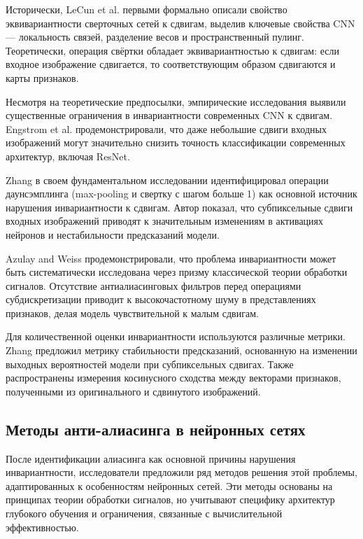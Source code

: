 Исторически, LeCun et al. \cite{lecun1998gradient} первыми формально описали свойство эквивариантности сверточных сетей к сдвигам, выделив ключевые свойства CNN — локальность связей, разделение весов и пространственный пулинг. Теоретически, операция свёртки обладает эквивариантностью к сдвигам: если входное изображение сдвигается, то соответствующим образом сдвигаются и карты признаков.

Несмотря на теоретические предпосылки, эмпирические исследования выявили существенные ограничения в инвариантности современных CNN к сдвигам. Engstrom et al. \cite{engstrom2019exploring} продемонстрировали, что даже небольшие сдвиги входных изображений могут значительно снизить точность классификации современных архитектур, включая ResNet.

Zhang \cite{Zhang2019blurpool} в своем фундаментальном исследовании идентифицировал операции даунсэмплинга (max-pooling и свертку с шагом больше 1) как основной источник нарушения инвариантности к сдвигам. Автор показал, что субпиксельные сдвиги входных изображений приводят к значительным изменениям в активациях нейронов и нестабильности предсказаний модели.

Azulay and Weiss \cite{azulay2019deep} продемонстрировали, что проблема инвариантности может быть систематически исследована через призму классической теории обработки сигналов. Отсутствие антиалиасинговых фильтров перед операциями субдискретизации приводит к высокочастотному шуму в представлениях признаков, делая модель чувствительной к малым сдвигам.

Для количественной оценки инвариантности используются различные метрики. Zhang \cite{Zhang2019blurpool} предложил метрику стабильности предсказаний, основанную на изменении выходных вероятностей модели при субпиксельных сдвигах. Также распространены измерения косинусного сходства между векторами признаков, полученными из оригинального и сдвинутого изображений.

\subsection{Методы анти-алиасинга в нейронных сетях}
\label{review:antialias}

После идентификации алиасинга как основной причины нарушения инвариантности, исследователи предложили ряд методов решения этой проблемы, адаптированных к особенностям нейронных сетей. Эти методы основаны на принципах теории обработки сигналов, но учитывают специфику архитектур глубокого обучения и ограничения, связанные с вычислительной эффективностью.


